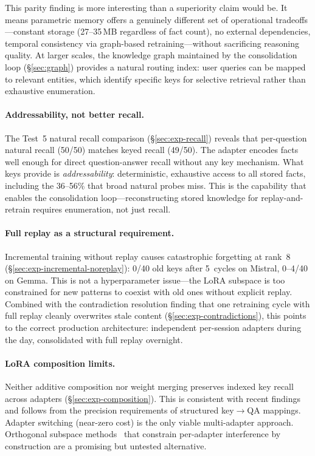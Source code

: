 \documentclass[11pt]{article}
\begin{document}
This parity finding is more interesting than a superiority claim would be.
It means parametric memory offers a genuinely different set of operational tradeoffs---constant storage (27--35\,MB regardless of fact count), no external dependencies, temporal consistency via graph-based retraining---without sacrificing reasoning quality.
At larger scales, the knowledge graph maintained by the consolidation loop (\S\ref{sec:graph}) provides a natural routing index: user queries can be mapped to relevant entities, which identify specific keys for selective retrieval rather than exhaustive enumeration.

\paragraph{Addressability, not better recall.}
The Test~5 natural recall comparison (\S\ref{sec:exp-recall}) reveals that per-question natural recall (50/50) matches keyed recall (49/50).
The adapter encodes facts well enough for direct question-answer recall without any key mechanism.
What keys provide is \emph{addressability}: deterministic, exhaustive access to all stored facts, including the 36--56\% that broad natural probes miss.
This is the capability that enables the consolidation loop---reconstructing stored knowledge for replay-and-retrain requires enumeration, not just recall.

\paragraph{Full replay as a structural requirement.}
Incremental training without replay causes catastrophic forgetting at rank~8 (\S\ref{sec:exp-incremental-noreplay}): 0/40 old keys after 5~cycles on Mistral, 0--4/40 on Gemma.
This is not a hyperparameter issue---the LoRA subspace is too constrained for new patterns to coexist with old ones without explicit replay.
Combined with the contradiction resolution finding that one retraining cycle with full replay cleanly overwrites stale content (\S\ref{sec:exp-contradictions}), this points to the correct production architecture: independent per-session adapters during the day, consolidated with full replay overnight.

\paragraph{LoRA composition limits.}
Neither additive composition nor weight merging preserves indexed key recall across adapters (\S\ref{sec:exp-composition}).
This is consistent with recent findings~\citep{zhang2025unraveling, back2026understanding} and follows from the precision requirements of structured key$\rightarrow$QA mappings.
Adapter switching (near-zero cost) is the only viable multi-adapter approach.
Orthogonal subspace methods~\citep{wang2023olora, liang2024inflora} that constrain per-adapter interference by construction are a promising but untested alternative.
\end{document}
